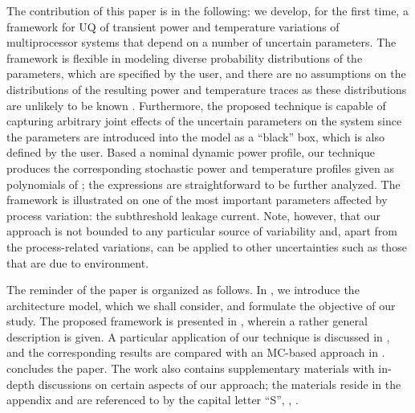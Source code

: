 The contribution of this paper is in the following: we develop, for the first time, a framework for UQ of transient power and temperature variations of multiprocessor systems that depend on a number of uncertain parameters. The framework is flexible in modeling diverse probability distributions of the parameters, which are specified by the user, and there are no assumptions on the distributions of the resulting power and temperature traces as these distributions are unlikely to be known \apriori. Furthermore, the proposed technique is capable of capturing arbitrary joint effects of the uncertain parameters on the system since the parameters are introduced into the model as a ``black'' box, which is also defined by the user. Based a nominal dynamic power profile, our technique produces the corresponding stochastic power and temperature profiles given as polynomials of \rvs; the expressions are straightforward to be further analyzed. The framework is illustrated on one of the most important parameters affected by process variation: the subthreshold leakage current. Note, however, that our approach is not bounded to any particular source of variability and, apart from the process-related variations, can be applied to other uncertainties such as those that are due to environment.


The reminder of the paper is organized as follows. In , we introduce the architecture model, which we shall consider, and formulate the objective of our study. The proposed framework is presented in , wherein a rather general description is given. A particular application of our technique is discussed in , and the corresponding results are compared with an MC-based approach in .  concludes the paper. The work also contains supplementary materials with in-depth discussions on certain aspects of our approach; the materials reside in the appendix and are referenced to by the capital letter ``S'', \eg, .
